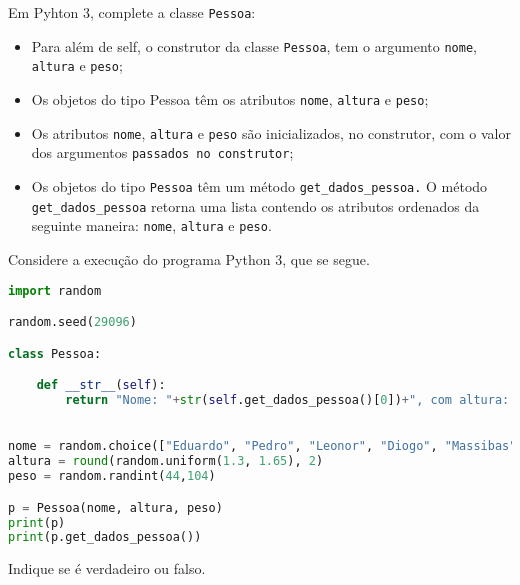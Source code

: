 \documentclass[12pt,varwidth=16cm,border=17pt]{standalone}
\begin{document}
Em Pyhton 3, complete a classe \verb+Pessoa+:

\begin{itemize}
  \item Para além de self, o construtor da classe \verb+Pessoa+, tem o argumento \verb+nome+, \verb+altura+ e \verb+peso+;
  \item Os objetos do tipo Pessoa têm os atributos \verb+nome+, \verb+altura+ e \verb+peso+;
  \item Os atributos \verb+nome+, \verb+altura+ e \verb+peso+ são inicializados, no construtor, com o valor
   dos argumentos \verb+passados no construtor+;
  \item Os objetos do tipo \verb+Pessoa+ têm um método \verb+get_dados_pessoa.+ 
  O método \verb+get_dados_pessoa+ retorna uma lista contendo os atributos ordenados da seguinte maneira: \verb+nome+, \verb+altura+ e \verb+peso+. 
\end{itemize}

Considere a execução do programa Python 3, que se segue. 

\begin{lstlisting}[language=Python]
import random

random.seed(29096)

class Pessoa:

	def __str__(self):
		return "Nome: "+str(self.get_dados_pessoa()[0])+", com altura: "+str(self.get_dados_pessoa()[1])+" e peso: "+str(self.get_dados_pessoa()[2])
		

nome = random.choice(["Eduardo", "Pedro", "Leonor", "Diogo", "Massibas", "Marta", "Miguel", "Beatriz", "Madorna", "Rita", "Fonseca", "Duarte", "Margarida"])
altura = round(random.uniform(1.3, 1.65), 2)
peso = random.randint(44,104)

p = Pessoa(nome, altura, peso)
print(p)
print(p.get_dados_pessoa())
\end{lstlisting}

Indique se é verdadeiro ou falso.
\end{document}
